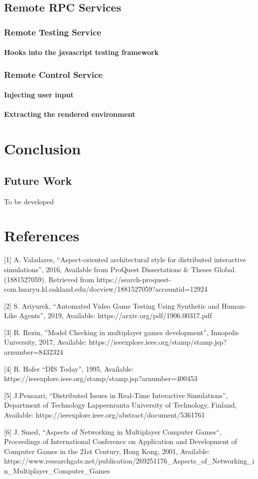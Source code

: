 \documentclass[conference]{IEEEtran}
\begin{document}
\subsection{Remote RPC Services}
\subsubsection{Remote Testing Service}
\paragraph{Hooks into the javascript testing framework}
\subsubsection{Remote Control Service}
\paragraph{Injecting user input}
\paragraph{Extracting the rendered environment}


\section{Conclusion}
\subsection{Future Work}

To be developed

\section{References}
[1] A. Valadares, “Aspect-oriented architectural style for distributed interactive simulations”, 2016,
Available from ProQuest Dissertations \& Theses Global. (1881527059).
Retrieved from https://search-proquest-com.huaryu.kl.oakland.edu/docview/1881527059?accountid=12924

[2] S. Ariyurek, “Automated Video Game Testing Using
Synthetic and Human-Like Agents”, 2019, Available: https://arxiv.org/pdf/1906.00317.pdf

[3] R. Rezin, ”Model Checking in multiplayer games development”, Innopolis University,
2017, Available: https://ieeexplore.ieee.org/stamp/stamp.jsp?arnumber=8432324

[4] R. Hofer “DIS Today”, 1995, Available:
https://ieeexplore.ieee.org/stamp/stamp.jsp?arnumber=400453

[5] J.Peusaari, “Distributed Issues in Real-Time Interactive Simulations”, Department of Technology Lappeenranta University of Technology, Finland,
 Available: https://ieeexplore.ieee.org/abstract/document/5361761

[6] J. Smed, “Aspects of Networking in Multiplayer Computer Games“, Proceedings of International Conference on Application and Development of Computer Games in the 21st Century, Hong Kong, 2001,
Available: https://www.researchgate.net/publication/269251176\_Aspects\_of\_Networking\_in\_Multiplayer\_Computer\_Games
\end{document}
